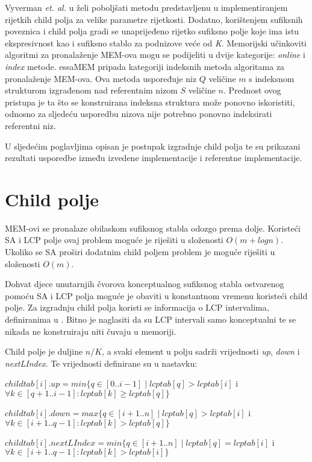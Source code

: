 \documentclass[times, utf8, seminar, numeric]{fer}
\begin{document}
Vyverman \textit{et. al.} u \cite{essa} želi poboljšati metodu predstavljenu u \cite{ssa} implementiranjem rijetkih child polja za velike parametre rijetkosti. Dodatno, korištenjem sufiksnih poveznica  i child polja gradi se unaprijeđeno rijetko sufiksno polje  koje ima istu ekspresivnost kao i sufiksno stablo za podnizove veće od \textit{K}. Memorijski učinkoviti algoritmi za pronalaženje MEM-ova mogu se podijeliti u dvije kategorije: \textit{online} i \textit{index} metode. essaMEM pripada kategoriji indeksnih metoda algoritama za pronalaženje MEM-ova. Ova metoda uspoređuje niz $Q$ veličine $m$ s indeksnom strukturom izgrađenom nad referentnim nizom $S$ veličine $n$. Prednost ovog pristupa je ta što se konstruirana indeksna struktura može ponovno iskoristiti, odnosno za sljedeću usporedbu nizova nije potrebno ponovno indeksirati referentni niz. 

U sljedećim poglavljima opisan je postupak izgradnje child polja te su prikazani rezultati usporedbe između izvedene implementacije i referentne implementacije.

\chapter{Child polje}
MEM-ovi se pronalaze obilaskom sufiksnog stabla odozgo prema dolje. Koristeći SA i LCP polje ovaj problem moguće je riješiti u složenosti $O(m + log n)$. Ukoliko se SA proširi dodatnim child poljem problem je moguće riješiti u složenosti $O(m)$.

Dohvat djece unutarnjih čvorova konceptualnog sufiksnog stabla ostvarenog pomoću SA i LCP polja moguće je obaviti u konstantnom vremenu koristeći child polje. Za izgradnju child polja koristi se informacija o LCP intervalima, definiranima u \citep{esa}. Bitno je naglasiti da su LCP intervali samo konceptualni te se nikada ne konstruiraju niti čuvaju u memoriji.

Child polje je duljine $n / K$, a svaki element u polju sadrži vrijednosti \textit{up}, \textit{down} i \textit{nextLIndex}. Te vrijednosti definirane su u nastavku:

$childtab[i].up = min\{q \in [0..i-1] \mid lcptab[q] > lcptab[i]$ i $\forall k \in [q+1..i-1] : lcptab[k] \geq lcptab[q]\}$

$childtab[i].down = max\{q \in [i+1..n] \mid lcptab[q] > lcptab[i]$ i $\forall k \in [i+1..q-1] : lcptab[k] > lcptab[q]\}$

$childtab[i].nextLIndex = min\{q \in [i+1..n] \mid lcptab[q] = lcptab[i]$ i $\forall k \in [i+1..q-1] : lcptab[k] > lcptab[i]\}$
\end{document}
